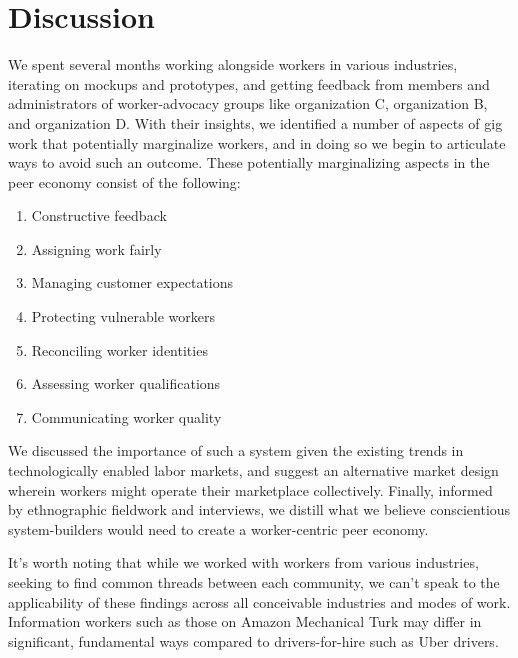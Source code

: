 \section{Discussion}
We spent several months working alongside workers in various industries,
iterating on mockups and prototypes,
and getting feedback from members and administrators of worker-advocacy groups like organization C, organization B, and organization D.
With their insights, we identified a number of aspects of gig work that potentially marginalize workers,
and in doing so we begin to articulate ways to avoid such an outcome.
These potentially marginalizing aspects in the peer economy consist of the following:

\begin{enumerate}\itemsep0pt \parskip0pt
  \item Constructive feedback
  \item Assigning work fairly
  \item Managing customer expectations
  \item Protecting vulnerable workers
  \item Reconciling worker identities
  \item Assessing worker qualifications
  \item Communicating worker quality
\end{enumerate}

We discussed the importance of such a system given the existing trends in technologically enabled labor markets,
and suggest an alternative market design wherein workers might operate their marketplace collectively.
Finally, informed by ethnographic fieldwork and interviews, we distill what we believe conscientious system-builders would need to create a worker-centric peer economy.

It's worth noting that while we worked with workers from various industries,
seeking to find common threads between each community,
we can't speak to the applicability of these findings across all conceivable industries and modes of work.
Information workers such as those on Amazon Mechanical Turk may differ in significant,
fundamental ways compared to drivers-for-hire such as Uber drivers.

